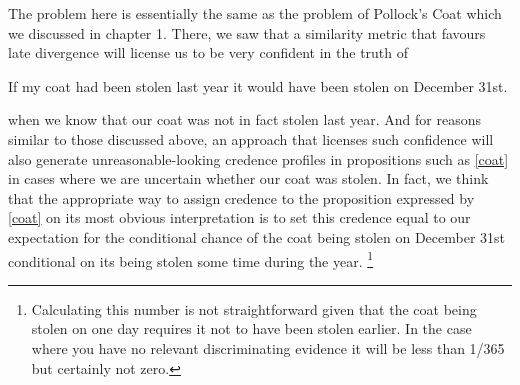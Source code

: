 \documentclass[leqno, 11pt, a5paper, openany]{article}
\begin{document}
The problem here is essentially the same as the problem of Pollock's Coat which we discussed in chapter 1. There, we saw that a similarity metric that favours late divergence will license us to be very confident in the truth of
\begin{prop}
\nitem \label{coat}
  If my coat had been stolen last year it would have been stolen on
  December 31st.
\end{prop}
when we know that our coat was not in fact stolen last year. And for reasons similar to those discussed above, an approach that licenses such confidence will also generate unreasonable-looking credence profiles in propositions such as \ref{coat} in cases where we are uncertain whether our coat was stolen. In fact, we think that the appropriate way to assign credence to the proposition expressed by \ref{coat} on its most obvious interpretation is to set this credence equal to our expectation for the conditional chance of the coat being stolen on December 31st conditional on its being stolen some time during the year.%
\footnote{Calculating this number is not straightforward given that the coat being stolen on one day requires it not to have been stolen earlier. In the case where you have no relevant discriminating evidence it will be less than 1/365 but certainly not zero.}
\end{document}
